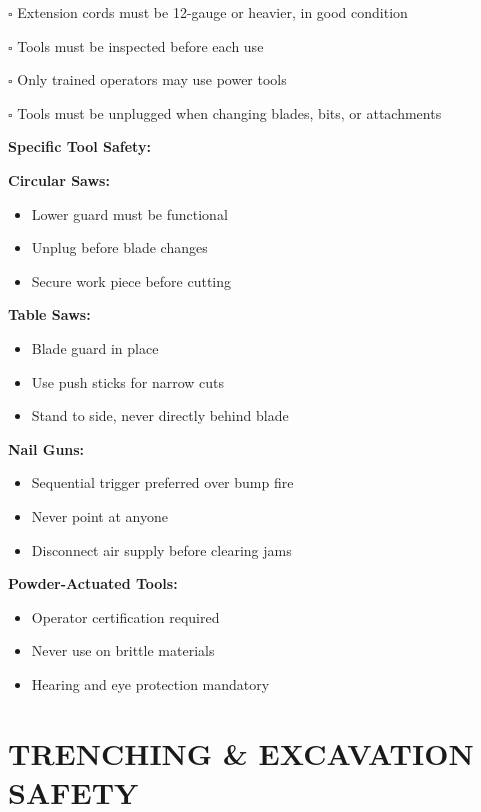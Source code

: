 \documentclass[11pt,letterpaper]{article}
\begin{document}
$\square$ Extension cords must be 12-gauge or heavier, in good condition

$\square$ Tools must be inspected before each use

$\square$ Only trained operators may use power tools

$\square$ Tools must be unplugged when changing blades, bits, or attachments

\vspace{6pt}

\textbf{Specific Tool Safety:}

\textbf{Circular Saws:}
\begin{itemize}[leftmargin=0.75in]
\item Lower guard must be functional
\item Unplug before blade changes
\item Secure work piece before cutting
\end{itemize}

\textbf{Table Saws:}
\begin{itemize}[leftmargin=0.75in]
\item Blade guard in place
\item Use push sticks for narrow cuts
\item Stand to side, never directly behind blade
\end{itemize}

\textbf{Nail Guns:}
\begin{itemize}[leftmargin=0.75in]
\item Sequential trigger preferred over bump fire
\item Never point at anyone
\item Disconnect air supply before clearing jams
\end{itemize}

\textbf{Powder-Actuated Tools:}
\begin{itemize}[leftmargin=0.75in]
\item Operator certification required
\item Never use on brittle materials
\item Hearing and eye protection mandatory
\end{itemize}

\vspace{12pt}

\section*{TRENCHING \& EXCAVATION SAFETY}
\end{document}
